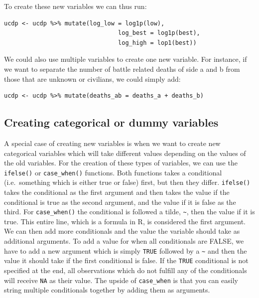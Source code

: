 \documentclass[
]{book}
\begin{document}
To create these new variables we can thus run:

\begin{verbatim}
ucdp <- ucdp %>% mutate(log_low = log1p(low),
                                log_best = log1p(best),
                                log_high = lop1(best))
\end{verbatim}

We could also use multiple variables to create one new variable. For instance, if we want to separate the number of battle related deaths of side a and b from those that are unknown or civilians, we could simply add:

\begin{verbatim}
ucdp <- ucdp %>% mutate(deaths_ab = deaths_a + deaths_b)
\end{verbatim}

\hypertarget{creating-categorical-or-dummy-variables}{%
\subsection{Creating categorical or dummy variables}\label{creating-categorical-or-dummy-variables}}

A special case of creating new variables is when we want to create new categorical variables which will take different values depending on the values of the old variables. For the creation of these types of variables, we can use the \texttt{ifelse()} or \texttt{case\_when()} functions. Both functions takes a conditional (i.e.~something which is either true or false) first, but then they differ. \texttt{ifelse()} takes the conditional as the first argument and then takes the value if the conditional is true as the second argument, and the value if it is false as the third. For \texttt{case\_when()} the conditional is followed a tilde, \texttt{\textasciitilde{}}, then the value if it is true. This entire line, which is a formula in R, is considered the first argument. We can then add more conditionals and the value the variable should take as additional arguments. To add a value for when all conditionals are FALSE, we have to add a new argument which is simply \texttt{TRUE} followed by a \texttt{\textasciitilde{}} and then the value it should take if the first conditional is false. If the \texttt{TRUE} conditional is not specified at the end, all observations which do not fulfill any of the conditionals will receive \texttt{NA} as their value. The upside of \texttt{case\_when} is that you can easily string multiple conditionals together by adding them as arguments.
\end{document}

